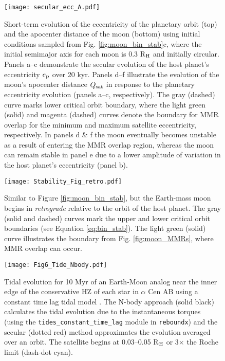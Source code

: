 \documentclass[preprint]{aastex63}
\begin{document}
\begin{figure}
	\texttt{[image: secular\_ecc\_A.pdf]}
    \caption{{Short-term evolution of the eccentricity of the planetary orbit (top) and the apocenter distance of the moon (bottom) using initial conditions sampled from Fig. \ref{fig:moon_bin_stab}c, where the initial semimajor axis for each moon is  0.3 R$_{\rm H}$ and initially circular.  Panels a--c demonstrate the secular evolution of the host planet's eccentricity $e_{\rm p}$ over 20 kyr.  Panels d--f illustrate the evolution of the moon's apocenter distance $Q_{\rm sat}$ in response to the planetary eccentricity evolution (panels a--c, respectively).  The gray (dashed) curve marks lower critical orbit boundary, where the light green (solid) and magenta (dashed) curves denote the boundary for MMR overlap for the minimum and maximum satellite eccentricity, respectively.  In panels d \& f the moon eventually becomes unstable as a result of entering the MMR overlap region, whereas the moon can remain stable in panel e due to a lower amplitude of variation in the host planet's eccentricity (panel b).}}
    \label{fig:moon_sec_evol}
\end{figure}

\begin{figure}
	\texttt{[image: Stability\_Fig\_retro.pdf]}
    \caption{Similar to Figure \ref{fig:moon_bin_stab}, but the Earth-mass moon begins in \textit{retrograde} relative to the orbit of the host planet. The gray (solid and dashed) curves mark the upper and lower critical orbit boundaries (see Equation \ref{eq:bin_stab}).  The light green (solid) curve illustrates the boundary from Fig. \ref{fig:moon_MMRs}, where MMR overlap can occur.}
    \label{fig:moon_bin_retro}
\end{figure}

\begin{figure}
	\texttt{[image: Fig6\_Tide\_Nbody.pdf]}
    \cprotect\caption{Tidal evolution for {10 Myr} of an Earth-Moon analog near the inner edge of the conservative HZ of each star in $\alpha$ Cen AB using a constant time lag tidal model \citep{HUT1981}.  The N-body approach (solid black) calculates the tidal evolution due to the instantaneous torques { (using the \verb|tides_constant_time_lag| module \citep{Baronett2021} in \texttt{reboundx})} and the secular (dotted red) method approximates the evolution averaged over an orbit.  The satellite begins at 0.03--0.05 R$_{\rm H}$ or 3$\times$ the Roche limit (dash-dot cyan).}
    \label{fig:Nbody_comp}
\end{figure}
\end{document}
